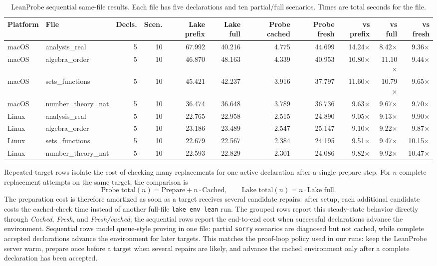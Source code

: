 \documentclass{article}
\begin{document}
\begin{table}[H]
\centering
\caption{LeanProbe sequential same-file results. Each file has five declarations and ten partial/full scenarios. Times are total seconds for the file.}
\label{tab:appendix-leanprobe-sequential}
\footnotesize
\setlength{\tabcolsep}{3pt}
\begin{tabular}{llrrrrrrrrr}
\toprule
Platform & File & Decls. & Scen. & Lake prefix & Lake full & Probe cached & Probe fresh & vs prefix & vs full & vs fresh \\
\midrule
macOS & analysis\_real & 5 & 10 & 67.992 & 40.216 & 4.775 & 44.699 & 14.24$\times$ & 8.42$\times$ & 9.36$\times$ \\
macOS & algebra\_order & 5 & 10 & 46.870 & 48.163 & 4.339 & 40.953 & 10.80$\times$ & 11.10$\times$ & 9.44$\times$ \\
macOS & sets\_functions & 5 & 10 & 45.421 & 42.237 & 3.916 & 37.797 & 11.60$\times$ & 10.79$\times$ & 9.65$\times$ \\
macOS & number\_theory\_nat & 5 & 10 & 36.474 & 36.648 & 3.789 & 36.736 & 9.63$\times$ & 9.67$\times$ & 9.70$\times$ \\
Linux & analysis\_real & 5 & 10 & 22.765 & 22.958 & 2.515 & 24.890 & 9.05$\times$ & 9.13$\times$ & 9.90$\times$ \\
Linux & algebra\_order & 5 & 10 & 23.186 & 23.489 & 2.547 & 25.147 & 9.10$\times$ & 9.22$\times$ & 9.87$\times$ \\
Linux & sets\_functions & 5 & 10 & 22.679 & 22.567 & 2.384 & 24.195 & 9.51$\times$ & 9.47$\times$ & 10.15$\times$ \\
Linux & number\_theory\_nat & 5 & 10 & 22.593 & 22.829 & 2.301 & 24.086 & 9.82$\times$ & 9.92$\times$ & 10.47$\times$ \\
\bottomrule
\end{tabular}
\end{table}

Repeated-target rows isolate the cost of checking many replacements for one active declaration after a single prepare step.
For $n$ complete replacement attempts on the same target, the comparison is
\[
  \text{Probe total}(n)=\text{Prepare}+n\cdot\text{Cached},
  \qquad
  \text{Lake total}(n)=n\cdot\text{Lake full}.
\]
The preparation cost is therefore amortized as soon as a target receives several candidate repairs: after setup, each additional candidate costs the cached-check time instead of another full-file \texttt{lake env lean} run.
The grouped rows report this steady-state behavior directly through \emph{Cached}, \emph{Fresh}, and \emph{Fresh/cached}; the sequential rows report the end-to-end cost when successful declarations advance the environment.
Sequential rows model queue-style proving in one file: partial \texttt{sorry} scenarios are diagnosed but not cached, while complete accepted declarations advance the environment for later targets.
This matches the proof-loop policy used in our runs: keep the LeanProbe server warm, prepare once before a target when several repairs are likely, and advance the cached environment only after a complete declaration has been accepted.
\end{document}
